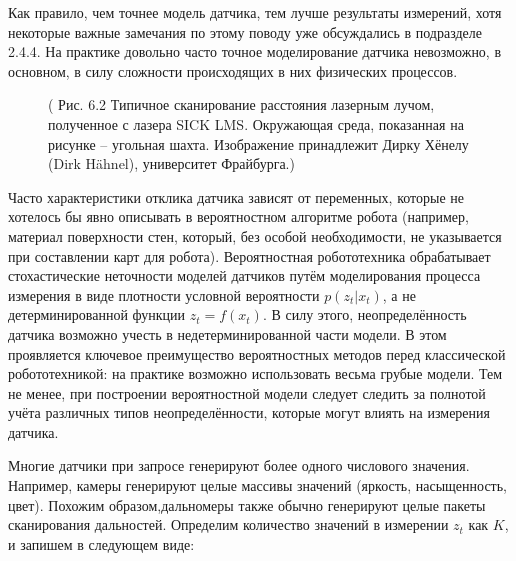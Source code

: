 \documentclass[10pt,a4paper]{article}
\begin{document}
Как правило, чем точнее модель датчика, тем лучше результаты измерений, хотя некоторые важные замечания по этому поводу уже обсуждались в подразделе 2.4.4. На практике довольно часто  точное моделирование датчика невозможно, в основном, в силу сложности происходящих в них физических процессов.

\begin{figure}[H]
	\caption{ (  Рис. 6.2 Типичное сканирование расстояния лазерным лучом, полученное с лазера SICK LMS. Окружающая среда, показанная на рисунке – угольная шахта. Изображение принадлежит Дирку Хёнелу (Dirk Hähnel), университет Фрайбурга.)}
	\label{fig:62orig}
\end{figure}

Часто характеристики отклика датчика зависят от переменных, которые не хотелось бы явно описывать в вероятностном алгоритме робота (например, материал поверхности стен, который, без особой необходимости, не указывается при составлении карт для робота). Вероятностная робототехника обрабатывает стохастические неточности моделей датчиков путём моделирования процесса измерения в виде плотности условной вероятности $p(z_t | x_t)$, а не детерминированной функции $z_t = f(x_t)$. В силу этого, неопределённость датчика возможно учесть в недетерминированной части модели. В этом проявляется ключевое преимущество вероятностных методов перед классической робототехникой: на практике возможно использовать весьма грубые модели. Тем не менее, при построении вероятностной модели следует следить за полнотой учёта различных типов неопределённости, которые могут влиять на измерения датчика. 

Многие датчики при запросе генерируют более одного числового значения. Например, камеры генерируют целые массивы значений (яркость, насыщенность, цвет). Похожим образом,дальномеры также обычно генерируют целые пакеты сканирования дальностей. Определим количество значений в измерении $z_t$ как $K$, и запишем в следующем виде:\\
\end{document}
